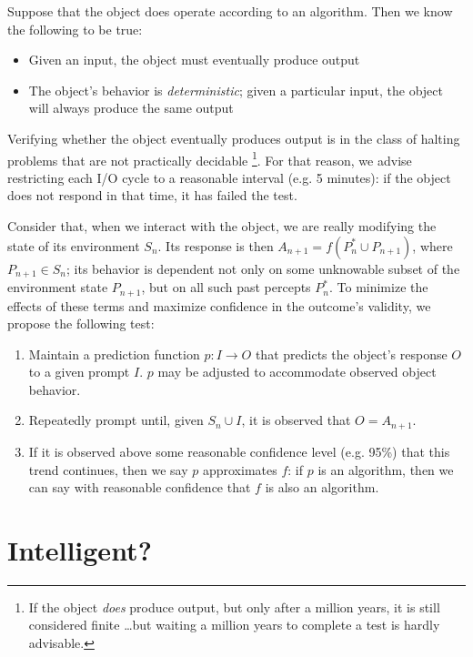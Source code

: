 \documentclass[12pt,letterpaper]{article}
\begin{document}
Suppose that the object does operate according to an algorithm. Then we know the following to be true:

\begin{itemize}
	\singlespacing
	\item Given an input, the object must eventually produce output
	\item The object's behavior is \emph{deterministic}; given a particular input, the object will always produce the same output
\end{itemize}

Verifying whether the object eventually produces output is in the class of halting problems \cite{Russell:2010} that are not practically decidable \footnote{If the object \emph{does} produce output, but only after a million years, it is still considered finite \ldots but waiting a million years to complete a test is hardly advisable.}. For that reason, we advise restricting each I/O cycle to a reasonable interval (e.g. 5 minutes): if the object does not respond in that time, it has failed the test.

Consider that, when we interact with the object, we are really modifying the state of its environment $S_n$. Its response is then $A_{n+1} = f(P_n^\ast \cup P_{n+1})$, where $P_{n+1} \in S_n$; its behavior is dependent not only on some unknowable subset of the environment state $P_{n+1}$, but on all such past percepts $P_n^\ast$. To minimize the effects of these terms and maximize confidence in the outcome's validity, we propose the following test:

\begin{enumerate}
	\singlespacing
	\item Maintain a prediction function $p : I \to O$ that predicts the object's response $O$ to a given prompt $I$. $p$ may be adjusted to accommodate observed object behavior.
	\item Repeatedly prompt until, given $S_{n} \cup I$, it is observed that $O = A_{n+1}$.
	\item If it is observed above some reasonable confidence level (e.g. 95\%) that this trend continues, then we say $p$ approximates $f$: if $p$ is an algorithm, then we can say with reasonable confidence that $f$ is also an algorithm.
\end{enumerate}

\section*{Intelligent?}
\end{document}
